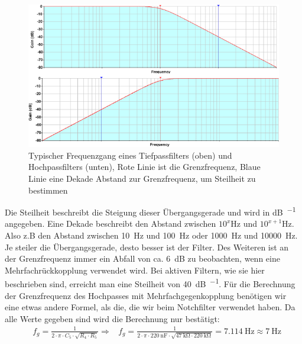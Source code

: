 \documentclass[10pt]{article}
\begin{document}
\begin{figure}[h!]
    \centering
    \includegraphics[scale=0.5]{pictures/Low_Highpass.png}
    \caption{Typischer Frequenzgang eines Tiefpassfilters (oben) und Hochpassfilters (unten), Rote Linie ist die Grenzfrequenz, Blaue Linie eine Dekade Abstand zur Grenzfrequenz, um Steilheit zu bestimmen}
    \label{fig:LHP}
\end{figure}

Die Steilheit beschreibt die Steigung dieser Übergangsgerade und wird in \si{\dB\per\dek} angegeben. 
Eine Dekade beschreibt den Abstand zwischen $10^x$\si{\hertz} und $10^{x+1}$\si{\hertz}. 
Also z.B den Abstand zwischen \SI{10}{\hertz} und \SI{100}{\hertz} oder \SI{1000}{\hertz} und \SI{10000}{\hertz}. 
Je steiler die Übergangsgerade, desto besser ist der Filter. 
Des Weiteren ist an der Grenzfrequenz immer ein Abfall von ca. \SI{6}{\dB} zu beobachten, wenn eine Mehrfachrückkopplung verwendet wird. 
Bei aktiven Filtern, wie sie hier beschrieben sind, erreicht man eine Steilheit von \SI{40}{\dB\per\dek}. 
Für die Berechnung der Grenzfrequenz des Hochpasses mit Mehrfachgegenkopplung benötigen wir eine etwas andere Formel, als die, die wir beim Notchfilter verwendet haben. Da alle Werte gegeben sind wird die Berechnung nur bestätigt:
%
\begin{align*}
                & f_g=\frac{1}{2 \cdot \pi \cdot C_5 \cdot \sqrt{{R_4} \cdot R_5}} 
    \Rightarrow & f_g =\frac{1}{2 \cdot \pi \cdot \SI{220}{\nano\farad} \cdot \sqrt{\SI{47}{\kohm} \cdot \SI{220}{\kohm}}} = \SI{7.114}{\hertz} 
    \approx \SI{7}{\hertz}
\end{align*}
  
\end{document}
